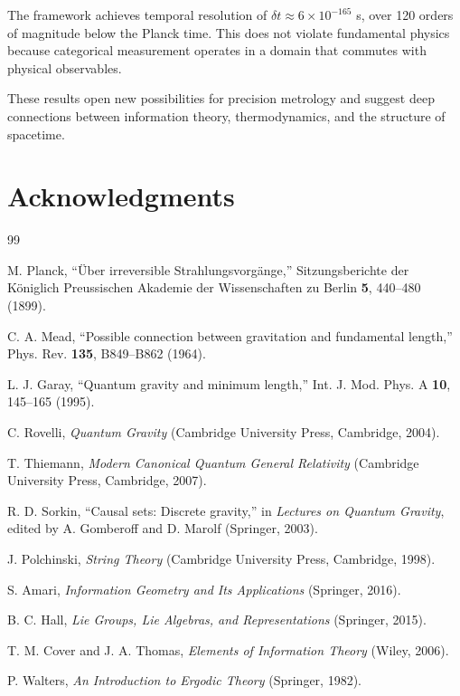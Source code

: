 \documentclass[twocolumn,10pt]{article}
\theoremstyle{remark}
\begin{document}
The framework achieves temporal resolution of $\delta t \approx 6 \times 10^{-165}$ s, over 120 orders of magnitude below the Planck time. This does not violate fundamental physics because categorical measurement operates in a domain that commutes with physical observables.

These results open new possibilities for precision metrology and suggest deep connections between information theory, thermodynamics, and the structure of spacetime.

\section*{Acknowledgments}




\begin{thebibliography}{99}

 M. Planck, ``\"{U}ber irreversible Strahlungsvorg\"{a}nge,'' Sitzungsberichte der K\"{o}niglich Preussischen Akademie der Wissenschaften zu Berlin \textbf{5}, 440--480 (1899).

 C. A. Mead, ``Possible connection between gravitation and fundamental length,'' Phys. Rev. \textbf{135}, B849--B862 (1964).

 L. J. Garay, ``Quantum gravity and minimum length,'' Int. J. Mod. Phys. A \textbf{10}, 145--165 (1995).

 C. Rovelli, \textit{Quantum Gravity} (Cambridge University Press, Cambridge, 2004).

 T. Thiemann, \textit{Modern Canonical Quantum General Relativity} (Cambridge University Press, Cambridge, 2007).

 R. D. Sorkin, ``Causal sets: Discrete gravity,'' in \textit{Lectures on Quantum Gravity}, edited by A. Gomberoff and D. Marolf (Springer, 2003).

 J. Polchinski, \textit{String Theory} (Cambridge University Press, Cambridge, 1998).

 S. Amari, \textit{Information Geometry and Its Applications} (Springer, 2016).

 B. C. Hall, \textit{Lie Groups, Lie Algebras, and Representations} (Springer, 2015).

 T. M. Cover and J. A. Thomas, \textit{Elements of Information Theory} (Wiley, 2006).

 P. Walters, \textit{An Introduction to Ergodic Theory} (Springer, 1982).

\end{thebibliography}
\end{document}
